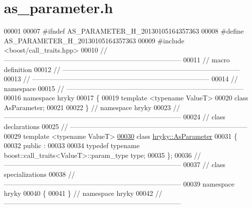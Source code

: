 \hypertarget{as__parameter_8h_source}{\section{as\-\_\-parameter.\-h}
}

\begin{DoxyCode}
00001 
00007 \textcolor{preprocessor}{#ifndef AS\_PARAMETER\_H\_20130105164357363}
00008 \textcolor{preprocessor}{}\textcolor{preprocessor}{#define AS\_PARAMETER\_H\_20130105164357363}
00009 \textcolor{preprocessor}{}\textcolor{preprocessor}{#include <boost/call\_traits.hpp>}
00010 \textcolor{comment}{//
      ------------------------------------------------------------------------------}
00011 \textcolor{comment}{// macro definition}
00012 \textcolor{comment}{//
      ------------------------------------------------------------------------------}
00013 \textcolor{comment}{//
      ------------------------------------------------------------------------------}
00014 \textcolor{comment}{// namespace}
00015 \textcolor{comment}{//
      ------------------------------------------------------------------------------}
00016 \textcolor{keyword}{namespace }hryky
00017 \{
00019     \textcolor{keyword}{template} <\textcolor{keyword}{typename} ValueT>
00020     \textcolor{keyword}{class }AsParameter;
00021 
00022 \} \textcolor{comment}{// namespace hryky}
00023 \textcolor{comment}{//
      ------------------------------------------------------------------------------}
00024 \textcolor{comment}{// class declarations}
00025 \textcolor{comment}{//
      ------------------------------------------------------------------------------}
00029 \textcolor{comment}{}\textcolor{keyword}{template} <\textcolor{keyword}{typename} ValueT>
\hypertarget{as__parameter_8h_source_l00030}{}\hyperlink{classhryky_1_1_as_parameter}{00030} \textcolor{keyword}{class }\hyperlink{classhryky_1_1_as_parameter}{hryky::AsParameter}
00031 \{
00032 \textcolor{keyword}{public} :
00033 
00034     \textcolor{keyword}{typedef} \textcolor{keyword}{typename} boost::call\_traits<ValueT>::param\_type type;
00035 \};
00036 \textcolor{comment}{//
      ------------------------------------------------------------------------------}
00037 \textcolor{comment}{// class specializations}
00038 \textcolor{comment}{//
      ------------------------------------------------------------------------------}
00039 \textcolor{keyword}{namespace }hryky
00040 \{
00041 \} \textcolor{comment}{// namespace hryky}
00042 \textcolor{comment}{//
      ------------------------------------------------------------------------------}

\end{DoxyCode}
